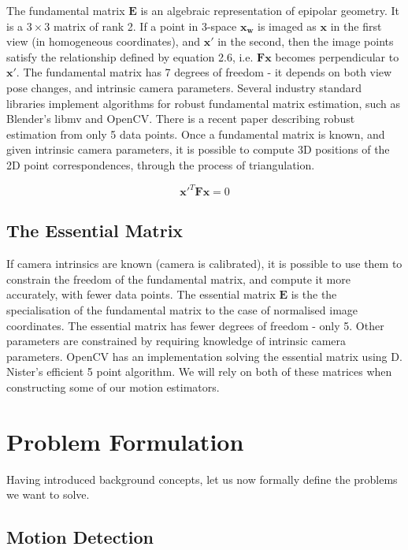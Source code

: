 \documentclass[11pt,english]{report}
\begin{document}
The fundamental matrix $\mathbf{E}$ is an algebraic representation of epipolar geometry. It is a $3 \times 3$ matrix of rank 2. If a point in 3-space $\mathbf{x_w}$ is imaged as $\mathbf{x}$ in the first view (in homogeneous coordinates), and $\mathbf{x'}$ in the second, then the image points satisfy the relationship defined by equation 2.6\cite{hartley_zisserman_2004}, i.e. $\mathbf{Fx}$ becomes perpendicular to $\mathbf{x'}$. The fundamental matrix has 7 degrees of freedom - it depends on both view pose changes, and intrinsic camera parameters. Several industry standard libraries implement algorithms for robust fundamental matrix estimation, such as Blender's libmv and OpenCV. There is a recent paper describing robust estimation from only 5 data points\cite{8578130}. Once a fundamental matrix is known, and given intrinsic camera parameters, it is possible to compute 3D positions of the 2D point correspondences, through the process of triangulation.

\begin{equation}
	\mathbf{x'}^T \mathbf{F} \mathbf{x} = 0
\end{equation}

\subsection{The Essential Matrix}

If camera intrinsics are known (camera is calibrated), it is possible to use them to constrain the freedom of the fundamental matrix, and compute it more accurately, with fewer data points. The essential matrix $\mathbf{E}$ is the the specialisation of the fundamental matrix to the case of normalised image coordinates\cite{hartley_zisserman_2004}. The essential matrix has fewer degrees of freedom - only 5. Other parameters are constrained by requiring knowledge of intrinsic camera parameters. OpenCV has an implementation solving the essential matrix using D. Nister's efficient 5 point algorithm\cite{1211470}. We will rely on both of these matrices when constructing some of our motion estimators.

\section{Problem Formulation}

Having introduced background concepts, let us now formally define the problems we want to solve.

\subsection{Motion Detection}
\end{document}
